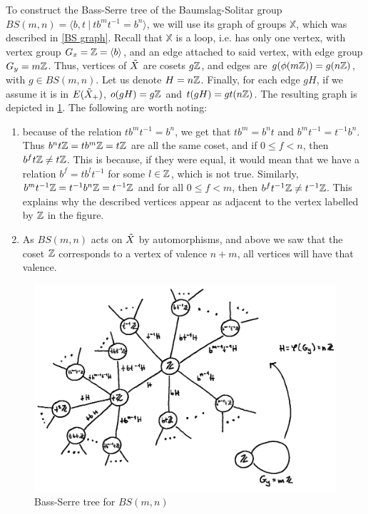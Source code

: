 \begin{importantexample}
    To construct the Bass-Serre tree of the Baumslag-Solitar group $BS(m,n) = \langle b,t \: | \: tb^mt^{-1} = b^n \rangle$, we will use its graph of groups $\mathbb{X}$, which was described in \ref{BS graph}. Recall that $\mathbb{X}$ is a loop, i.e. has only one vertex, with vertex group $G_x = \mathbb{Z} = \langle b\rangle$, and an edge attached to said vertex, with edge group $G_y = m\mathbb{Z}$. Thus, vertices of $\Tilde{X}$ are cosets $g\mathbb{Z}$, and edges are $g(\phi(m\mathbb{Z})) = g(n\mathbb{Z})$, with $g \in BS(m,n)$. Let us denote $H=n\mathbb{Z}$. Finally, for each edge $gH$, if we assume it is in $E(\Tilde{X}_+)$, $o(gH) = g\mathbb{Z}$ and $t(gH) = gt(n\mathbb{Z})$.
    The resulting graph is depicted in \ref{BS tree}.
    The following are worth noting:
    \begin{enumerate}
        \item because of the relation $tb^mt^{-1} = b^n$, we get that $tb^m = b^nt$ and $b^mt^{-1} = t^{-1}b^n$. Thus $b^nt\mathbb{Z} = tb^m\mathbb{Z} = t\mathbb{Z}$ are all the same coset, and if $0 \le f <n$, then $b^ft\mathbb{Z} \neq t\mathbb{Z}$. This is because, if they were equal, it would mean that we have a relation $b^f = tb^lt^{-1}$ for some $l \in \mathbb{Z}$, which is not true. Similarly, $b^mt^{-1}\mathbb{Z} = t^{-1}b^n\mathbb{Z} = t^{-1}\mathbb{Z}$ and for all $0 \le f <m$, then $b^ft^{-1}\mathbb{Z} \neq t^{-1}\mathbb{Z}$.
        This explains why the described vertices appear as adjacent to the vertex labelled by $\mathbb{Z}$ in the figure.
        \item As $BS(m,n)$ acts on $\Tilde{X}$ by automorphisms, and above we saw that the coset $\mathbb{Z}$ corresponds to a vertex of valence $n+m$, all vertices will have that valence. 
    \end{enumerate}
\end{importantexample}

\begin{figure}[ht]
    \centering
    \includegraphics[scale = 0.38]{sections/alicja/Tree of BS(m,n) corrected.jpeg}
    \caption{Bass-Serre tree for $BS(m,n)$}
    \label{BS tree}
\end{figure}


